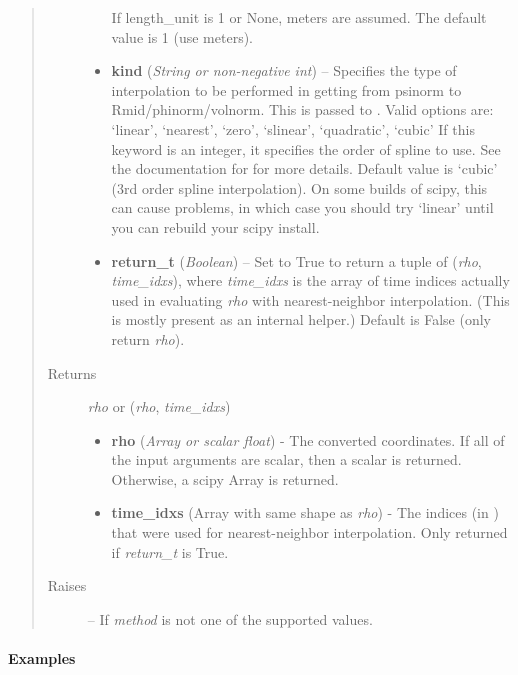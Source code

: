 \documentclass[letterpaper,10pt,english]{sphinxmanual}
\begin{document}
\begin{fulllineitems}
\begin{fulllineitems}
\begin{quote}
\begin{description}
\begin{itemize}
\begin{quote}
\end{quote}

If length\_unit is 1 or None, meters are assumed. The default
value is 1 (use meters).

\item {} 
\textbf{kind} (\emph{String or non-negative int}) --
Specifies the type of
interpolation to be performed in getting from psinorm to
Rmid/phinorm/volnorm. This is passed to
. Valid options are:
`linear', `nearest', `zero', `slinear', `quadratic', `cubic'
If this keyword is an integer, it specifies the order of spline
to use. See the documentation for  for more
details. Default value is `cubic' (3rd order spline
interpolation). On some builds of scipy, this can cause problems,
in which case you should try `linear' until you can rebuild your
scipy install.

\item {} 
\textbf{return\_t} (\emph{Boolean}) --
Set to True to return a tuple of (\emph{rho},
\emph{time\_idxs}), where \emph{time\_idxs} is the array of time indices
actually used in evaluating \emph{rho} with nearest-neighbor
interpolation. (This is mostly present as an internal helper.)
Default is False (only return \emph{rho}).

\end{itemize}

\item[{Returns}] \leavevmode

\emph{rho} or (\emph{rho}, \emph{time\_idxs})
\begin{itemize}
\item {} 
\textbf{rho} (\emph{Array or scalar float}) - The converted coordinates. If
all of the input arguments are scalar, then a scalar is returned.
Otherwise, a scipy Array is returned.

\item {} 
\textbf{time\_idxs} (Array with same shape as \emph{rho}) - The indices
(in ) that were used for
nearest-neighbor interpolation. Only returned if \emph{return\_t} is
True.

\end{itemize}


\item[{Raises}] \leavevmode
{} -- 
If \emph{method} is not one of the supported values.

\end{description}\end{quote}
\paragraph{Examples}


\end{fulllineitems}
\end{fulllineitems}
\end{document}
